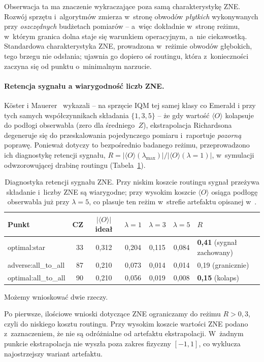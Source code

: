 \documentclass[11pt]{article}
\newcommand{\expv}{\langle O\rangle}
\begin{document}
Obserwacja ta ma znaczenie wykraczające poza samą charakterystykę ZNE. Rozwój sprzętu i~algorytmów
zmierza w~stronę obwodów \emph{płytkich} wykonywanych przy \emph{oszczędnych} budżetach pomiarów --
a~więc dokładnie w~stronę reżimu, w~którym granica dolna staje się warunkiem operacyjnym, a~nie
ciekawostką. Standardowa charakterystyka ZNE, prowadzona w~reżimie obwodów głębokich, tego brzegu
nie odsłania; ujawnia go dopiero oś routingu, która z~konieczności zaczyna się od punktu
o~minimalnym narzucie.

\paragraph{Retencja sygnału a wiarygodność liczb ZNE.} Köster i Mauerer~\cite{koster2026} wykazali
-- na sprzęcie IQM tej samej klasy co Emerald i przy tych samych współczynnikach składania
$\{1,3,5\}$ -- że gdy wartość $\expv$ kolapsuje do podłogi obserwabla (zero dla średniego~$Z$),
ekstrapolacja Richardsona degeneruje się do przeskalowania pojedynczego pomiaru i~raportuje
\emph{pozorną} poprawę. Ponieważ dotyczy to bezpośrednio badanego reżimu, przeprowadzono ich
diagnostykę retencji sygnału, $R=|\expv(\lambda_{\max})|/|\expv(\lambda{=}1)|$, w~symulacji
odwzorowującej drabinę routingu (Tabela~\ref{tab:retencja}).

\begin{table}[!ht]\centering
\caption{Diagnostyka retencji sygnału ZNE. Przy niskim koszcie routingu sygnał przeżywa składanie
i~liczby ZNE są wiarygodne; przy wysokim koszcie $\expv$ osiąga podłogę obserwabla już przy
$\lambda=5$, co plasuje ten reżim w~strefie artefaktu opisanej w~\cite{koster2026}.}
\label{tab:retencja}
\begin{tabular}{lrccccl}
\toprule
Punkt & CZ & $|\expv|$ ideał & $\lambda{=}1$ & $\lambda{=}3$ & $\lambda{=}5$ & $R$ \\
\midrule
optimal:star       & 33 & 0{,}312 & 0{,}204 & 0{,}115 & 0{,}084 & \textbf{0{,}41} (sygnał zachowany) \\
adverse:all\_to\_all & 87 & 0{,}210 & 0{,}073 & 0{,}014 & 0{,}014 & 0{,}19 (granicznie) \\
optimal:all\_to\_all & 90 & 0{,}210 & 0{,}056 & 0{,}019 & 0{,}008 & \textbf{0{,}15} (kolaps) \\
\bottomrule
\end{tabular}
\end{table}

Możemy wnioskować dwie rzeczy.

Po pierwsze, ilościowe wnioski dotyczące ZNE ograniczamy do reżimu $R>0{,}3$, czyli do niskiego
kosztu routingu. Przy wysokim koszcie wartości ZNE podano z~zaznaczeniem, że nie są odróżnialne od
artefaktu ekstrapolacji. W~żadnym punkcie ekstrapolacja nie wyszła poza zakres fizyczny $[-1,1]$,
co wyklucza najostrzejszy wariant artefaktu.
\end{document}

